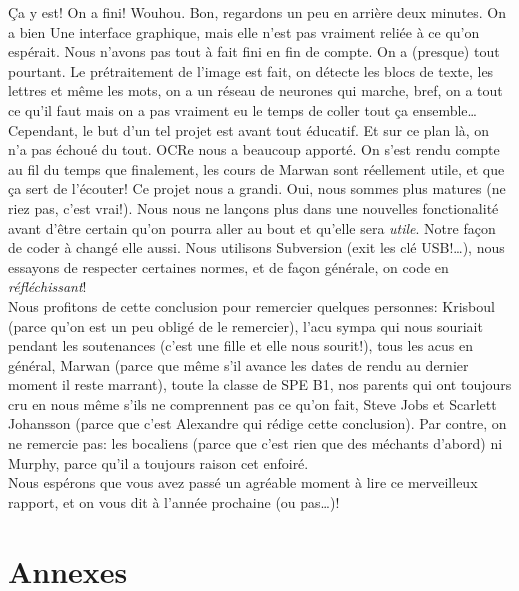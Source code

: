\documentclass[a4paper,12pt]{report}
\begin{document}
\c Ca y est! On a fini! Wouhou. Bon, regardons un peu en arri\`ere deux minutes. On a bien Une interface graphique, mais elle n'est pas vraiment reli\'ee \`a ce qu'on esp\'erait. Nous n'avons pas tout \`a fait fini en fin de compte. On a (presque) tout pourtant. Le pr\'etraitement de l'image est fait, on d\'etecte les blocs de texte, les lettres et m\^eme les mots, on a un r\'eseau de neurones qui marche, bref, on a tout ce qu'il faut mais on a pas vraiment eu le temps de coller tout \c ca ensemble\ldots \\
Cependant, le but d'un tel projet est avant tout \'educatif. Et sur ce plan l\`a, on n'a pas \'echou\'e du tout. OCRe nous a beaucoup apport\'e. On s'est rendu compte au fil du temps que finalement, les cours de Marwan sont r\'eellement utile, et que \c ca sert de l'\'ecouter! Ce projet nous a grandi. Oui, nous sommes plus matures (ne riez pas, c'est vrai!). Nous nous ne lan\c cons plus dans une nouvelles fonctionalit\'e avant d'\^etre certain qu'on pourra aller au bout et qu'elle sera \emph{utile}. Notre fa\c con de coder \`a chang\'e elle aussi. Nous utilisons Subversion (exit les cl\'e USB!\ldots), nous essayons de respecter certaines normes, et de fa\c con g\'en\'erale, on code en \emph{r\'efl\'echissant}! \\
Nous profitons de cette conclusion pour remercier quelques personnes: Krisboul (parce qu'on est un peu oblig\'e de le remercier), l'acu sympa qui nous souriait pendant les soutenances (c'est une fille et elle nous sourit!), tous les acus en g\'en\'eral, Marwan (parce que m\^eme s'il avance les dates de rendu au dernier moment il reste marrant), toute la classe de SPE B1, nos parents qui ont toujours cru en nous m\^eme s'ils ne comprennent pas ce qu'on fait, Steve Jobs et Scarlett Johansson (parce que c'est Alexandre qui r\'edige cette conclusion).
Par contre, on ne remercie pas: les bocaliens (parce que c'est rien que des m\'echants d'abord) ni Murphy, parce qu'il a toujours raison cet enfoir\'e.\\
Nous esp\'erons que vous avez pass\'e un agr\'eable moment \`a lire ce merveilleux rapport, et on vous dit \`a l'ann\'ee prochaine (ou pas\ldots)!










\appendix

\chapter{Annexes} %
\label{cha:annexes}
\end{document}
